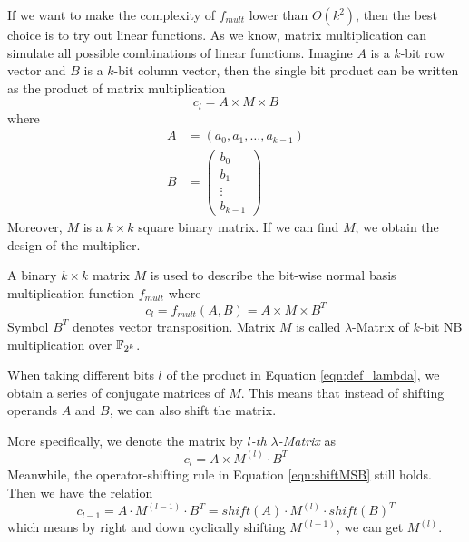 If we want to make the complexity of $f_{mult}$ lower than $O(k^2)$, then the best choice is to try out 
linear functions. As we know, matrix multiplication can simulate all possible combinations of 
linear functions. 
Imagine $A$ is a $k$-bit row vector and $B$ is a $k$-bit 
column vector, then the single bit product can be written as the product of matrix multiplication
$$c_{l} = A\times M\times B$$
where 
\begin{align*}
A &= (a_0,a_1,\dots,a_{k-1})\\
B &= \begin{pmatrix}
b_0 \\
b_1 \\
\vdots \\
b_{k-1}
\end{pmatrix}
\end{align*}
Moreover, $M$ is a $k\times k$ square binary matrix. If we can find $M$, we obtain the design of the multiplier.

\begin{Definition}
A binary $k\times k$ matrix $M$ is used to describe the bit-wise normal basis multiplication function $f_{mult}$ where
\begin{equation}
\label{eqn:def_lambda}
c_{l} = f_{mult}(A, B) = A \times M \times B^T
\end{equation}
Symbol $B^T$ denotes vector transposition. Matrix $M$ is called $\lambda$-Matrix of
$k$-bit NB multiplication over ${\mathbb{F}}_{2^k}$.
\end{Definition} 

When taking different bits $l$ of the product in Equation \ref{eqn:def_lambda}, 
we obtain a series of conjugate matrices of $M$. 
This means that instead of shifting operands $A$ and $B$, we can also shift the 
matrix.

More specifically, we denote the matrix by \emph{$l$-th $\lambda$-Matrix} as 
$$c_l = A \times M^{(l)} \cdot B^T$$
Meanwhile, the operator-shifting rule in Equation \ref{eqn:shiftMSB} still holds. Then we have the relation 
$$c_{l-1} = A \cdot M^{(l-1)} \cdot B^T = shift(A) \cdot M^{(l)} \cdot shift(B)^T$$ which means
by right and down cyclically shifting $M^{(l-1)}$, we can get $M^{(l)}$.

